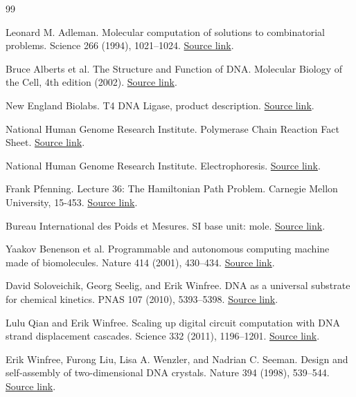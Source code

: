 \begin{thebibliography}{99}
 Leonard M. Adleman. Molecular computation of solutions to combinatorial problems. Science 266 (1994), 1021--1024. \href{https://computingbiology.github.io/docs/adleman1994.pdf}{Source link}.

 Bruce Alberts et al. The Structure and Function of DNA. Molecular Biology of the Cell, 4th edition (2002). \href{https://www.ncbi.nlm.nih.gov/books/NBK26821/}{Source link}.

 New England Biolabs. T4 DNA Ligase, product description. \href{https://www.neb.com/en-us/products/m0202-t4-dna-ligase}{Source link}.

 National Human Genome Research Institute. Polymerase Chain Reaction Fact Sheet. \href{https://www.genome.gov/about-genomics/fact-sheets/Polymerase-Chain-Reaction-Fact-Sheet}{Source link}.

 National Human Genome Research Institute. Electrophoresis. \href{https://www.genome.gov/genetics-glossary/Electrophoresis}{Source link}.

 Frank Pfenning. Lecture 36: The Hamiltonian Path Problem. Carnegie Mellon University, 15-453. \href{https://www.cs.cmu.edu/~fp/courses/flac/lectures/lecture36.html}{Source link}.

 Bureau International des Poids et Mesures. SI base unit: mole. \href{https://www.bipm.org/en/si-base-units/mole}{Source link}.

 Yaakov Benenson et al. Programmable and autonomous computing machine made of biomolecules. Nature 414 (2001), 430--434. \href{https://www.nature.com/articles/35106533}{Source link}.

 David Soloveichik, Georg Seelig, and Erik Winfree. DNA as a universal substrate for chemical kinetics. PNAS 107 (2010), 5393--5398. \href{https://doi.org/10.1073/pnas.0909380107}{Source link}.

 Lulu Qian and Erik Winfree. Scaling up digital circuit computation with DNA strand displacement cascades. Science 332 (2011), 1196--1201. \href{https://www.qianlab.caltech.edu/seesaw_digital_circuits2011.pdf}{Source link}.

 Erik Winfree, Furong Liu, Lisa A. Wenzler, and Nadrian C. Seeman. Design and self-assembly of two-dimensional DNA crystals. Nature 394 (1998), 539--544. \href{https://www.nature.com/articles/28998}{Source link}.
\end{thebibliography}
